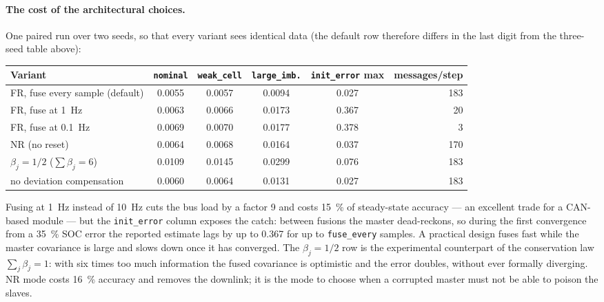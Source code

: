 \paragraph{The cost of the architectural choices.} One paired run over two seeds, so that every
variant sees identical data (the default row therefore differs in the last digit from the
three-seed table above):
\begin{center}\small
\begin{tabular}{@{}lccccr@{}}
\toprule
Variant & \texttt{nominal} & \texttt{weak\_cell} & \texttt{large\_imb.} & \texttt{init\_error} max & messages/step \\
\midrule
FR, fuse every sample (default) & 0.0055 & 0.0057 & 0.0094 & 0.027 & 183 \\
FR, fuse at \SI{1}{\hertz}              & 0.0063 & 0.0066 & 0.0173 & 0.367 &  20 \\
FR, fuse at \SI{0.1}{\hertz}            & 0.0069 & 0.0070 & 0.0177 & 0.378 &   3 \\
NR (no reset)                   & 0.0064 & 0.0068 & 0.0164 & 0.037 & 170 \\
$\beta_j=1/2$ ($\sum\beta_j=6$) & 0.0109 & 0.0145 & 0.0299 & 0.076 & 183 \\
no deviation compensation       & 0.0060 & 0.0064 & 0.0131 & 0.027 & 183 \\
\bottomrule
\end{tabular}
\end{center}
Fusing at \SI{1}{\hertz} instead of \SI{10}{\hertz} cuts the bus load by a factor \num{9} and
costs \SI{15}{\percent} of steady-state accuracy --- an excellent trade for a CAN-based module
--- but the \texttt{init\_error} column exposes the catch: between fusions the master dead-reckons,
so during the first convergence from a \SI{35}{\percent} SOC error the reported estimate lags by
up to \num{0.367} for up to \texttt{fuse\_every} samples. A practical design fuses fast while the
master covariance is large and slows down once it has converged. The $\beta_j=1/2$ row is the
experimental counterpart of the conservation law $\sum_j\beta_j=1$: with six times too much
information the fused covariance is optimistic and the error doubles, without ever formally
diverging. NR mode costs \SI{16}{\percent} accuracy and removes the downlink; it is the mode to
choose when a corrupted master must not be able to poison the slaves.

